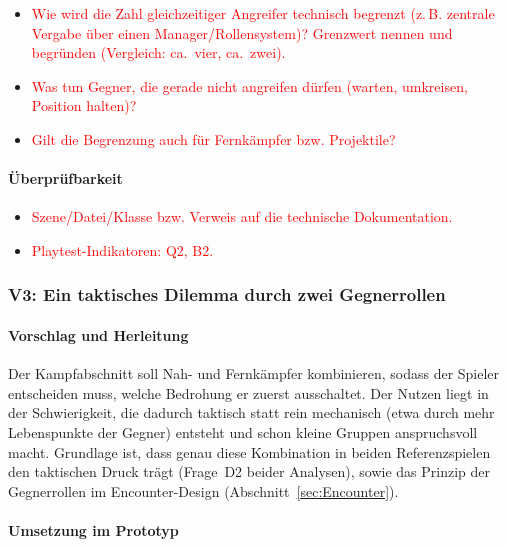 \documentclass[../Main.tex]{subfiles}
\begin{document}
\begin{itemize}[leftmargin=1.5cm]
    \item \textcolor{red}{Wie wird die Zahl gleichzeitiger Angreifer technisch begrenzt (z.\,B. zentrale Vergabe über einen Manager/Rollensystem)? Grenzwert nennen und begründen (Vergleich:  ca.\ vier,  ca.\ zwei).}
    \item \textcolor{red}{Was tun Gegner, die gerade nicht angreifen dürfen (warten, umkreisen, Position halten)?}
    \item \textcolor{red}{Gilt die Begrenzung auch für Fernkämpfer bzw. Projektile?}
\end{itemize}

\paragraph{Überprüfbarkeit}
\begin{itemize}[leftmargin=1.5cm]
    \item \textcolor{red}{Szene/Datei/Klasse bzw. Verweis auf die technische Dokumentation.}
    \item \textcolor{red}{Playtest-Indikatoren: Q2, B2.}
\end{itemize}

\subsubsection{V3: Ein taktisches Dilemma durch zwei Gegnerrollen} \label{sec:V3}

\paragraph{Vorschlag und Herleitung}
Der Kampfabschnitt soll Nah- und Fernkämpfer kombinieren, sodass der Spieler entscheiden muss, welche Bedrohung er zuerst ausschaltet. Der Nutzen liegt in der Schwierigkeit, die dadurch taktisch statt rein mechanisch (etwa durch mehr Lebenspunkte der Gegner) entsteht und schon kleine Gruppen anspruchsvoll macht. Grundlage ist, dass genau diese Kombination in beiden Referenzspielen den taktischen Druck trägt (Frage~D2 beider Analysen), sowie das Prinzip der Gegnerrollen im Encounter-Design (Abschnitt~\ref{sec:Encounter}).

\paragraph{Umsetzung im Prototyp}
\end{document}
